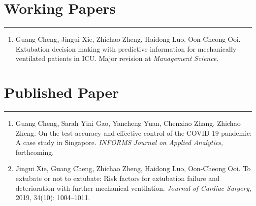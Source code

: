 \documentclass[12pt, a4paper]{article}
\begin{document}
{%

\section*{Working Papers}
\vspace*{0.4em}
\hrule height 0.5pt
\begin{enumerate}[leftmargin=36pt, itemsep=6pt, parsep=0.2pt, topsep=1pt]

	\item Guang Cheng, Jingui Xie, Zhichao Zheng, Haidong Luo, Oon-Cheong Ooi.
	Extubation decision making with predictive information for mechanically ventilated patients in ICU.
	Major revision at {\it Management Science}.

\end{enumerate}




\section*{Published Paper}
\vspace*{0.4em}
\hrule height 0.5pt
\begin{enumerate}[leftmargin=36pt, itemsep=6pt, parsep=0.2pt, topsep=1pt]

	\item Guang Cheng, Sarah Yini Gao, Yancheng Yuan, Chenxiao Zhang, Zhichao Zheng. 
	On the test accuracy and effective control of the COVID-19 pandemic: A case study in Singapore. 
	{\it INFORMS Journal on Applied Analytics}, forthcoming.

	\item Jingui Xie, Guang Cheng, Zhichao Zheng, Haidong Luo, Oon-Cheong Ooi. To extubate or not to extubate: Risk factors for extubation failure and deterioration with further mechanical ventilation. {\it Journal of Cardiac Surgery}, 2019, 34(10): 1004–1011. %


\end{enumerate}}
\end{document}

